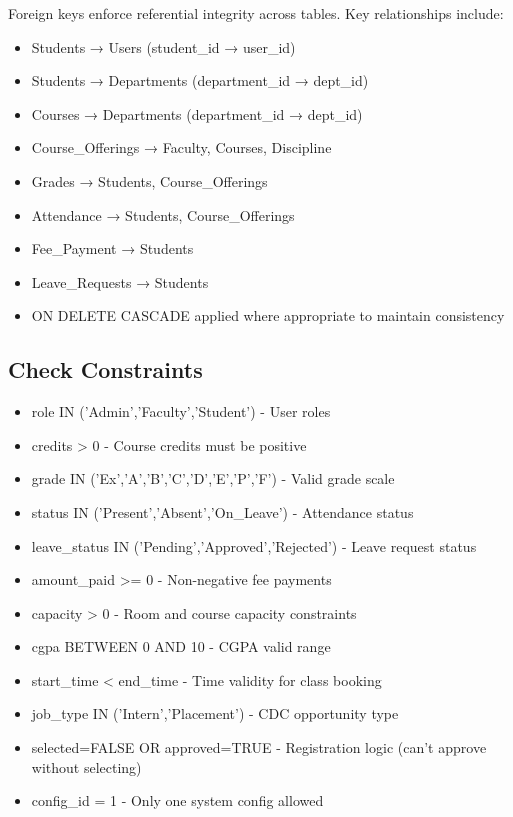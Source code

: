 \documentclass[12pt]{article}
\begin{document}
Foreign keys enforce referential integrity across tables. Key relationships include:
\begin{itemize}
    \item Students → Users (student\_id → user\_id)
    \item Students → Departments (department\_id → dept\_id)
    \item Courses → Departments (department\_id → dept\_id)
    \item Course\_Offerings → Faculty, Courses, Discipline
    \item Grades → Students, Course\_Offerings
    \item Attendance → Students, Course\_Offerings
    \item Fee\_Payment → Students
    \item Leave\_Requests → Students
    \item ON DELETE CASCADE applied where appropriate to maintain consistency
\end{itemize}

\subsection{Check Constraints}

\begin{itemize}
    \item role IN ('Admin','Faculty','Student') - User roles
    \item credits > 0 - Course credits must be positive
    \item grade IN ('Ex','A','B','C','D','E','P','F') - Valid grade scale
    \item status IN ('Present','Absent','On\_Leave') - Attendance status
    \item leave\_status IN ('Pending','Approved','Rejected') - Leave request status
    \item amount\_paid >= 0 - Non-negative fee payments
    \item capacity > 0 - Room and course capacity constraints
    \item cgpa BETWEEN 0 AND 10 - CGPA valid range
    \item start\_time < end\_time - Time validity for class booking
    \item job\_type IN ('Intern','Placement') - CDC opportunity type
    \item selected=FALSE OR approved=TRUE - Registration logic (can't approve without selecting)
    \item config\_id = 1 - Only one system config allowed
\end{itemize}
\end{document}
